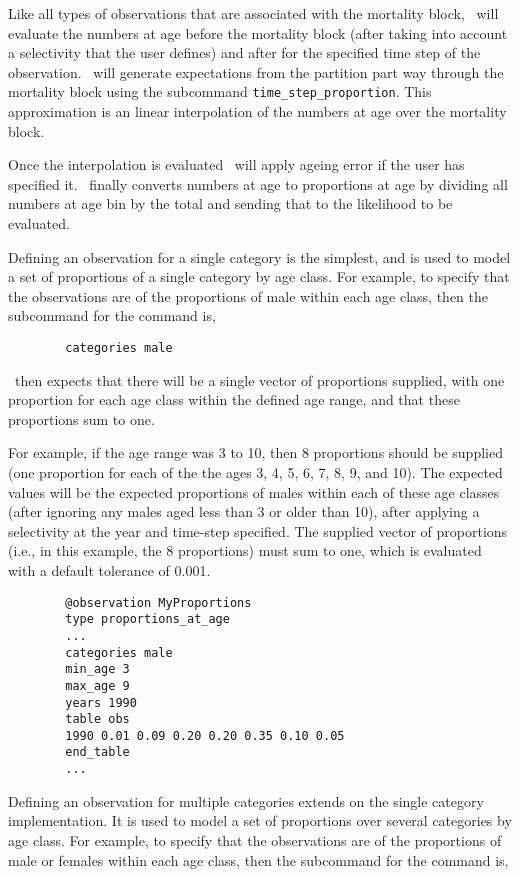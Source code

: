 Like all types of observations that are associated with the mortality block, \CNAME\ will evaluate the numbers at age before the mortality block (after taking into account a selectivity that the user defines) and after for the specified time step of the observation. \CNAME\ will generate expectations from the partition part way through the mortality block using the subcommand \texttt{time\_step\_proportion}. This approximation is an linear interpolation of the numbers at age over the mortality block. 

Once the interpolation is evaluated \CNAME\ will apply ageing error if the user has specified it. \CNAME\ finally converts numbers at age to proportions at age by dividing all numbers at age bin by the total and sending that to the likelihood to be evaluated.

Defining an observation for a single category is the simplest, and is used to model a set of proportions of a single category by age class. For example, to specify that the observations are of the proportions of male within each age class, then the subcommand  for the  command is,

{\small{\begin{verbatim}
		categories male
		\end{verbatim}}}

\CNAME\ then expects that there will be a single vector of proportions supplied, with one proportion for each age class within the defined age range, and that these proportions sum to one. 

For example, if the age range was 3 to 10, then 8 proportions should be supplied (one proportion for each of the the ages 3, 4, 5, 6, 7, 8, 9, and 10). The expected values will be the expected proportions of males within each of these age classes (after ignoring any males aged less than 3 or older than 10), after applying a selectivity at the year and time-step specified. The supplied vector of proportions (i.e., in this example, the 8 proportions) must sum to one, which is evaluated with a default tolerance of 0.001. 


{\small{\begin{verbatim}
		@observation MyProportions
		type proportions_at_age
		...
		categories male
		min_age 3
		max_age 9
		years 1990
		table obs
		1990 0.01 0.09 0.20 0.20 0.35 0.10 0.05
		end_table
		...
		\end{verbatim}}}


Defining an observation for multiple categories extends on the single category implementation. It is used to model a set of proportions over several categories by age class. For example, to specify that the observations are of the proportions of male or females within each age class, then the subcommand  for the  command is,

